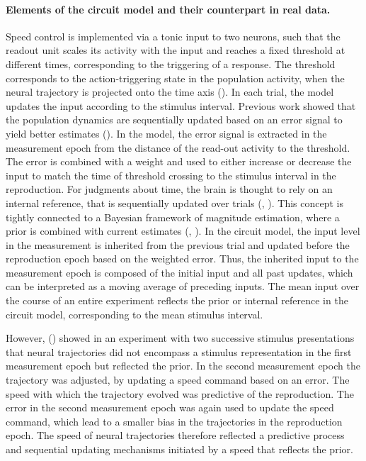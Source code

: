 \documentclass[10pt]{article}
\begin{document}
\paragraph{Elements of the circuit model and their counterpart in real data.}
Speed control is implemented via a tonic input to two neurons, such that the readout unit scales its activity with the input and reaches a fixed threshold at different times, corresponding to the triggering of a response.  
The threshold corresponds to the action-triggering state in the population activity, when the neural trajectory is projected onto the time axis (\cite{Remington2018}).
In each trial, the model updates the input according to the stimulus interval.
Previous work showed that the population dynamics are sequentially updated based on an error signal to yield better estimates (\cite{Egger2019}).
In the model, the error signal is extracted in the measurement epoch from the distance of the read-out activity to the threshold. 
The error is combined with a weight and used to either increase or decrease the input to match the time of threshold crossing to the stimulus interval in the reproduction.
For judgments about time, the brain is thought to rely on an internal reference, that is sequentially updated over trials (\cite{Dyjas2012}, \cite{Bausenhart2014}). This concept is tightly connected to a Bayesian framework of magnitude estimation, where a prior is combined with current estimates (\cite{Shi2013}, \cite{Petzschner2015}).
In the circuit model, the input level in the measurement is inherited from the previous trial and updated before the reproduction epoch based on the weighted error.
Thus, the inherited input to the measurement epoch is composed of the initial input and all past updates, which can be interpreted as a moving average of preceding inputs. 
The mean input over the course of an entire experiment reflects the prior or internal reference in the circuit model, corresponding to the mean stimulus interval.

However, \citeauthor{Egger2019} (\citeyear{Egger2019}) showed in an experiment with two successive stimulus presentations that neural trajectories did not encompass a stimulus representation in the first measurement epoch but reflected the prior.
In the second measurement epoch the trajectory was adjusted, by updating a speed command based on an error. The speed with which the trajectory evolved was predictive of the reproduction.  
The error in the second measurement epoch was again used to update the speed command, which lead to a smaller bias in the trajectories in the reproduction epoch.
The speed of neural trajectories therefore reflected a predictive process and sequential updating mechanisms initiated by a speed that reflects the prior. 
\end{document}
